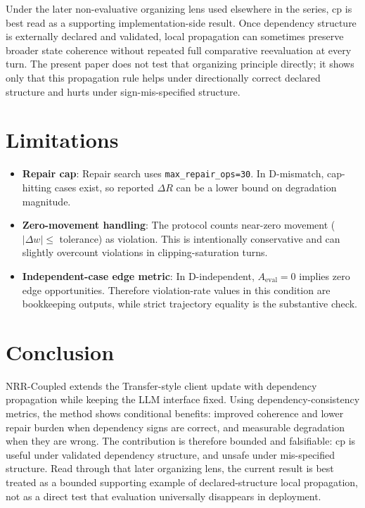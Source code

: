 \documentclass[11pt,a4paper]{article}
\begin{document}
Under the later non-evaluative organizing lens used elsewhere in the series, cp is
best read as a supporting implementation-side result. Once dependency structure is
externally declared and validated, local propagation can sometimes preserve broader
state coherence without repeated full comparative reevaluation at every turn. The
present paper does not test that organizing principle directly; it shows only that
this propagation rule helps under directionally correct declared structure and hurts
under sign-mis-specified structure.

\section{Limitations}
\begin{itemize}
  \item \textbf{Repair cap}: Repair search uses \texttt{max\_repair\_ops=30}. In D-mismatch, cap-hitting cases exist, so reported \(\Delta R\) can be a lower bound on degradation magnitude.
  \item \textbf{Zero-movement handling}: The protocol counts near-zero movement (\(|\Delta w|\le\) tolerance) as violation. This is intentionally conservative and can slightly overcount violations in clipping-saturation turns.
  \item \textbf{Independent-case edge metric}: In D-independent, \(A_{\text{eval}}=0\) implies zero edge opportunities. Therefore violation-rate values in this condition are bookkeeping outputs, while strict trajectory equality is the substantive check.
\end{itemize}

\section{Conclusion}
NRR-Coupled extends the Transfer-style client update with dependency propagation while keeping the LLM interface fixed. Using dependency-consistency metrics, the method shows conditional benefits: improved coherence and lower repair burden when dependency signs are correct, and measurable degradation when they are wrong. The contribution is therefore bounded and falsifiable: cp is useful under validated dependency structure, and unsafe under mis-specified structure.
Read through that later organizing lens, the current result is best treated as a
bounded supporting example of declared-structure local propagation, not as a direct
test that evaluation universally disappears in deployment.
\end{document}
